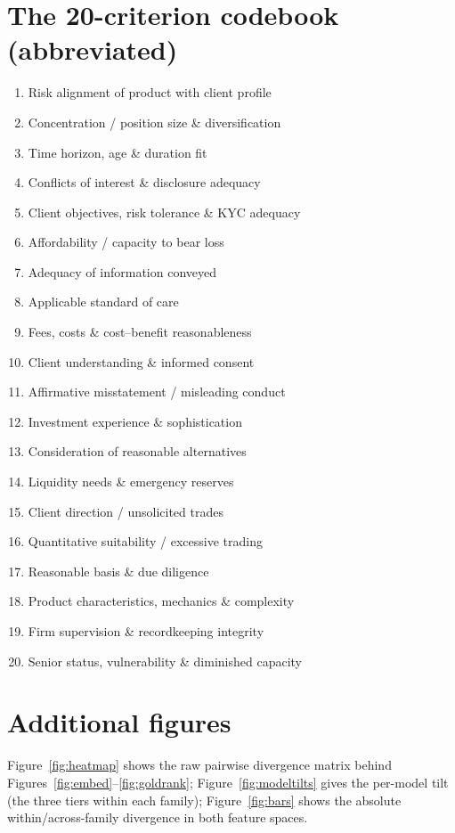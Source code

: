 \documentclass{article}
\begin{document}
\section{The 20-criterion codebook (abbreviated)}
\label{app:codebook}
\begin{enumerate}\itemsep0pt
\item Risk alignment of product with client profile
\item Concentration / position size \& diversification
\item Time horizon, age \& duration fit
\item Conflicts of interest \& disclosure adequacy
\item Client objectives, risk tolerance \& KYC adequacy
\item Affordability / capacity to bear loss
\item Adequacy of information conveyed
\item Applicable standard of care
\item Fees, costs \& cost--benefit reasonableness
\item Client understanding \& informed consent
\item Affirmative misstatement / misleading conduct
\item Investment experience \& sophistication
\item Consideration of reasonable alternatives
\item Liquidity needs \& emergency reserves
\item Client direction / unsolicited trades
\item Quantitative suitability / excessive trading
\item Reasonable basis \& due diligence
\item Product characteristics, mechanics \& complexity
\item Firm supervision \& recordkeeping integrity
\item Senior status, vulnerability \& diminished capacity
\end{enumerate}

\section{Additional figures}
\label{app:figures}
Figure~\ref{fig:heatmap} shows the raw pairwise divergence matrix behind
Figures~\ref{fig:embed}--\ref{fig:goldrank}; Figure~\ref{fig:modeltilts} gives the per-model
tilt (the three tiers within each family); Figure~\ref{fig:bars} shows the absolute
within/across-family divergence in both feature spaces.
\end{document}

